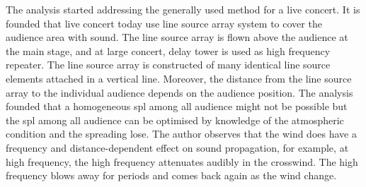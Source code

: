 The analysis started addressing the generally used method for a live concert. It is founded that live concert today use line source array system to cover the audience area with sound. The line source array is flown above the audience at the main stage, and at large concert, delay tower is used as high frequency repeater. The line source array is constructed of many identical line source elements attached in a vertical line. Moreover, the distance from the line source array to the individual audience depends on the audience position. The analysis founded that a homogeneous \gls{spl} among all audience might not be possible but the \gls{spl} among all audience can be optimised by knowledge of the atmospheric condition and the spreading lose. The author observes that the wind does have a frequency and distance-dependent effect on sound propagation, for example, at high frequency, the high frequency attenuates audibly in the crosswind. The high frequency blows away for periods and comes back again as the wind change. 
